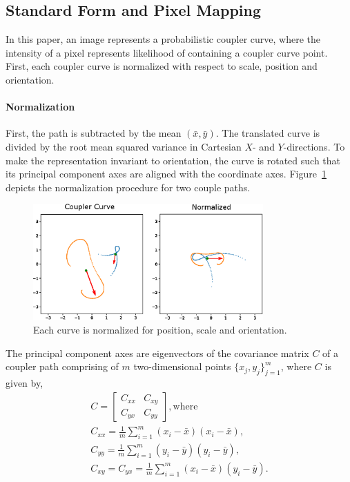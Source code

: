 \subsection{Standard Form and Pixel Mapping}
In this paper, an image represents a probabilistic coupler curve, where the intensity of a pixel represents likelihood of containing a coupler curve point. First, each coupler curve is normalized with respect to scale, position and orientation.

\paragraph{Normalization}

First, the path is subtracted by the mean $(\bar{x}, \bar{y})$. The translated curve is divided by the root mean squared variance in Cartesian $X$- and $Y$-directions.
To make the representation invariant to orientation, the curve is rotated such that its principal component axes are aligned with the coordinate axes. Figure~\ref{fig_curve_normalization} depicts the normalization procedure for two couple paths.

\begin{figure}
\centering
\includegraphics[width=250pt]{idetc-20/figure/fig_curve_normalization.eps}
  \caption{Each curve is normalized for position, scale and orientation.}
\label{fig_curve_normalization}
\end{figure}

The principal component axes are eigenvectors of the covariance matrix $C$ of a coupler path comprising of $m$ two-dimensional points $\{x_j, y_j\}_{j=1}^{m}$, where $C$ is given by,
\begin{eqnarray}
  C = \left[
\begin{array}{cc}
  C_{xx}  & C_{xy}  \\
  C_{yx}  & C_{yy}
\end{array}
\right],  \textrm{where}\\
C_{xx} = \frac {1}{m} \sum_{i=1}^{m}(x_i - \bar{x})(x_i - \bar{x}) ,\\
C_{yy} = \frac {1}{m} \sum_{i=1}^{m}(y_i - \bar{y})(y_i - \bar{y}) ,\\
C_{xy} = C_{yx} = \frac {1}{m} \sum_{i=1}^{m}(x_i - \bar{x})(y_i - \bar{y}).
\end{eqnarray}


